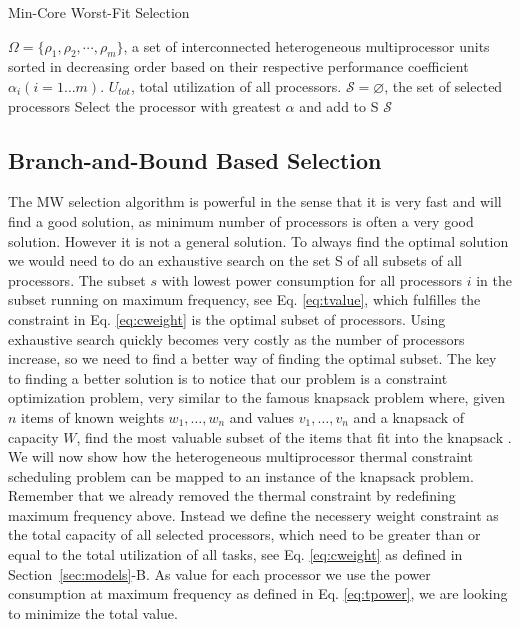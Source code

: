 \documentclass[conference]{IEEEtran}
\begin{document}
\begin{algorithm}
\caption{Min-Core Worst-Fit Selection} \label{algo:mw}
\footnotesize
\begin{algorithmic}[1]
\REQUIRE $\Omega = \{\rho_1, \rho_2,\cdots, \rho_m\}$, a set of interconnected heterogeneous multiprocessor units
 sorted in decreasing order based on their respective performance coefficient $\alpha_i (i=1\ldots m)$.
 $U_{tot}$, total utilization of all processors.
$\mathcal{S} = \varnothing$, the set of selected processors
	\STATE Select the processor with greatest $\alpha$ and add to {\cal S}
\ENDWHILE
\RETURN $\mathcal{S}$
\end{algorithmic}
\end{algorithm}


\subsection{Branch-and-Bound Based Selection}
The MW selection algorithm is powerful in the sense that it is very fast and will find a good solution, as minimum number of processors is often a very good solution. However it is not a general solution. To always find the optimal solution we would need to do an exhaustive search on the set {\cal S} of all subsets of all processors. The subset $s$ with lowest power consumption for all processors $i$ in the subset running on maximum frequency, see Eq. \ref{eq:tvalue}, which fulfilles the constraint in Eq. \ref{eq:cweight} is the optimal subset of processors. Using exhaustive search quickly becomes very costly as the number of processors increase, so we need to find a better way of finding the optimal subset.
The key to finding a better solution is to notice that our problem is a constraint optimization problem, very similar to the famous knapsack problem where, given $n$ items of known weights $w_1, \ldots, w_n$ and values $v_1, \ldots, v_n$ and a knapsack of capacity $W$, find the most valuable subset of the items that fit into the knapsack \cite{Levitin06}. We will now show how the heterogeneous multiprocessor thermal constraint scheduling problem can be mapped to an instance of the knapsack problem. Remember that we already removed the thermal constraint by redefining maximum frequency above. Instead we define the necessery weight constraint as the total capacity of all selected processors, which need to be greater than or equal to the total utilization of all tasks, see Eq. \ref{eq:cweight} as defined in Section~\ref{sec:models}-B. As value for each processor we use the power consumption at maximum frequency as defined in Eq. \ref{eq:tpower}, we are looking to minimize the total value.
\end{document}
